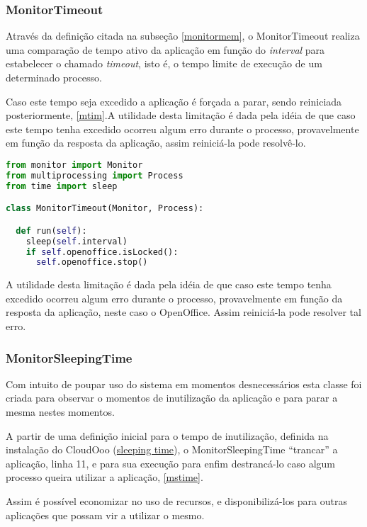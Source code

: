 \subsubsection{MonitorTimeout}
\label{monitortim}

Através da definição citada na subseção \ref{monitormem}, o MonitorTimeout realiza uma comparação de tempo ativo da aplicação em função do \textit{interval} para estabelecer o chamado \textit{timeout}, isto é, o tempo limite de execução de um determinado processo.

Caso este tempo seja excedido a aplicação é forçada a parar, sendo reiniciada posteriormente, \ref{mtim}.A utilidade desta limitação é dada pela idéia de que caso este tempo tenha excedido ocorreu algum erro durante o processo, provavelmente em função da resposta da aplicação, assim reiniciá-la pode resolvê-lo.

{\singlespace
\begin{lstlisting}[caption=Método run da classe MonitorTimeout,language=python,label={mtim}]
from monitor import Monitor
from multiprocessing import Process
from time import sleep

class MonitorTimeout(Monitor, Process):

  def run(self):
    sleep(self.interval)
    if self.openoffice.isLocked():
      self.openoffice.stop()
\end{lstlisting}
}

A utilidade desta limitação é dada pela idéia de que caso este tempo tenha excedido ocorreu algum erro durante o processo, provavelmente em função da resposta da aplicação, neste caso o OpenOffice. Assim reiniciá-la pode resolver tal erro.


\subsubsection{MonitorSleepingTime}

Com intuito de poupar uso do sistema em momentos desnecessários esta classe foi criada para observar o momentos de inutilização da aplicação e para parar a mesma nestes momentos.

A partir de uma definição inicial para o tempo de inutilização, definida na instalação do CloudOoo (\underline{sleeping time}), o MonitorSleepingTime ``trancar'' a aplicação, linha 11, e para sua execução para enfim destrancá-lo caso algum processo queira utilizar a aplicação, \ref{mstime}.

Assim é possível economizar no uso de recursos, e disponibilizá-los para outras aplicações que possam vir a utilizar o mesmo.

